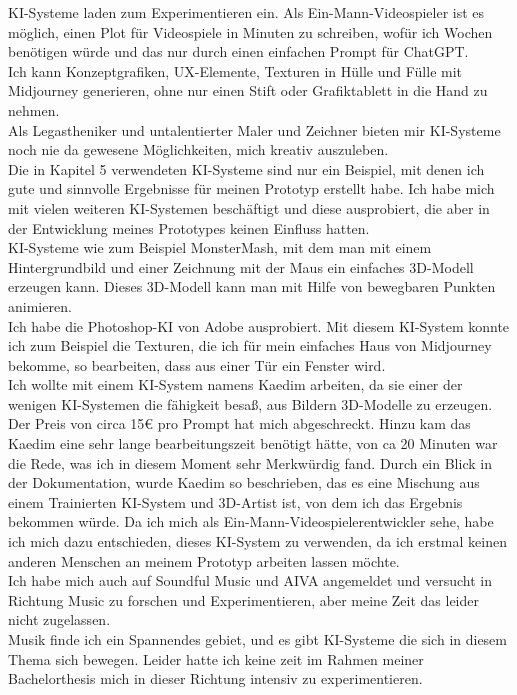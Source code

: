 \documentclass[10pt,a4paper,bibliography=totocnumbered,listof=totocnumbered]{scrartcl}
\begin{document}
KI-Systeme laden zum Experimentieren ein. Als Ein-Mann-Videospieler ist es möglich, einen Plot für Videospiele in Minuten zu schreiben, wofür ich Wochen benötigen würde und das nur durch einen einfachen Prompt für ChatGPT.
\\
Ich kann Konzeptgrafiken, UX-Elemente, Texturen in Hülle und Fülle mit Midjourney generieren, ohne nur einen Stift oder Grafiktablett in die Hand zu nehmen.
\\
Als Legastheniker und untalentierter Maler und Zeichner bieten mir KI-Systeme noch nie da gewesene Möglichkeiten, mich kreativ auszuleben.
\\
Die in Kapitel 5 verwendeten KI-Systeme sind nur ein Beispiel, mit denen ich gute und sinnvolle Ergebnisse für meinen Prototyp erstellt habe. Ich habe mich mit vielen weiteren KI-Systemen beschäftigt und diese ausprobiert, die aber in der Entwicklung meines Prototypes keinen Einfluss hatten.
\\
KI-Systeme wie zum Beispiel MonsterMash, mit dem man mit einem Hintergrundbild und einer Zeichnung mit der Maus ein einfaches 3D-Modell erzeugen kann. Dieses 3D-Modell kann man mit Hilfe von bewegbaren Punkten animieren.
\\
Ich habe die Photoshop-KI von Adobe ausprobiert. Mit diesem KI-System konnte ich zum Beispiel die Texturen, die ich für mein einfaches Haus von Midjourney bekomme, so bearbeiten, dass aus einer Tür ein Fenster wird.
\\
Ich wollte mit einem KI-System namens Kaedim arbeiten, da sie einer der wenigen KI-Systemen die fähigkeit besaß, aus Bildern 3D-Modelle zu erzeugen. Der Preis von circa 15€ pro Prompt hat mich abgeschreckt. Hinzu kam das Kaedim eine sehr lange bearbeitungszeit benötigt hätte, von ca 20 Minuten war die Rede, was ich in diesem Moment sehr Merkwürdig fand.
Durch ein Blick in der Dokumentation, wurde Kaedim so beschrieben, das es eine Mischung aus einem Trainierten KI-System und 3D-Artist ist, von dem ich das Ergebnis bekommen würde.
Da ich mich als Ein-Mann-Videospielerentwickler sehe, habe ich mich dazu entschieden, dieses KI-System zu verwenden, da ich erstmal keinen anderen Menschen an meinem Prototyp arbeiten lassen möchte.
\\
Ich habe mich auch auf Soundful Music und AIVA angemeldet und versucht in Richtung Music zu forschen und Experimentieren, aber meine Zeit das leider nicht zugelassen.
\\
Musik finde ich ein Spannendes gebiet, und es gibt KI-Systeme die sich in diesem Thema sich bewegen. Leider hatte ich keine zeit im Rahmen meiner Bachelorthesis mich in dieser Richtung intensiv zu experimentieren.
\end{document}
